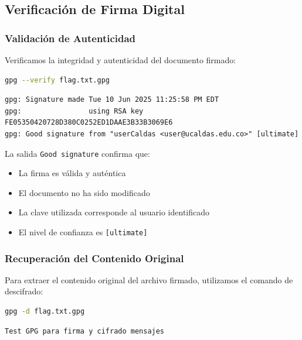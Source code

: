 \documentclass[12pt,a4paper]{article}
\begin{document}
\subsection{Verificación de Firma Digital}

\subsubsection{Validación de Autenticidad}

Verificamos la integridad y autenticidad del documento firmado:

\begin{lstlisting}[language=bash, caption=Verificación de la firma digital]
gpg --verify flag.txt.gpg
\end{lstlisting}

\begin{lstlisting}[language=text, caption=Resultado de la verificación de firma]
gpg: Signature made Tue 10 Jun 2025 11:25:58 PM EDT
gpg:                using RSA key FE05350420728D380C0252ED1DAAE3B33B3069E6
gpg: Good signature from "userCaldas <user@ucaldas.edu.co>" [ultimate]
\end{lstlisting}

La salida \texttt{Good signature} confirma que:

\begin{itemize}
  \item La firma es válida y auténtica
  \item El documento no ha sido modificado
  \item La clave utilizada corresponde al usuario identificado
  \item El nivel de confianza es \texttt{[ultimate]}
\end{itemize}

\subsubsection{Recuperación del Contenido Original}

Para extraer el contenido original del archivo firmado, utilizamos el comando
de descifrado:

\begin{lstlisting}[language=bash, caption=Extracción del contenido del documento firmado]
gpg -d flag.txt.gpg
\end{lstlisting}

\begin{lstlisting}[language=text, caption=Contenido recuperado del documento]
Test GPG para firma y cifrado mensajes
\end{lstlisting}
\end{document}
